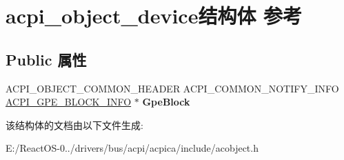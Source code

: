 \hypertarget{structacpi__object__device}{}\section{acpi\+\_\+object\+\_\+device结构体 参考}
\label{structacpi__object__device}
\subsection*{Public 属性}
\begin{DoxyCompactItemize}
\item 
\mbox{\label{structacpi__object__device_a0f041d3d95149451405b6ceee080a61a}} 
A\+C\+P\+I\+\_\+\+O\+B\+J\+E\+C\+T\+\_\+\+C\+O\+M\+M\+O\+N\+\_\+\+H\+E\+A\+D\+ER A\+C\+P\+I\+\_\+\+C\+O\+M\+M\+O\+N\+\_\+\+N\+O\+T\+I\+F\+Y\+\_\+\+I\+N\+FO \hyperlink{structacpi__gpe__block__info}{A\+C\+P\+I\+\_\+\+G\+P\+E\+\_\+\+B\+L\+O\+C\+K\+\_\+\+I\+N\+FO} $\ast$ {\bfseries Gpe\+Block}
\end{DoxyCompactItemize}


该结构体的文档由以下文件生成\+:\begin{DoxyCompactItemize}
\item 
E\+:/\+React\+O\+S-\/0../drivers/bus/acpi/acpica/include/acobject.\+h\end{DoxyCompactItemize}
